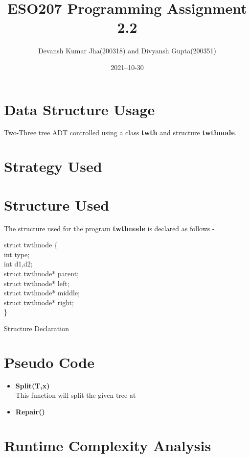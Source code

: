 \documentclass[20pt]{article}
\title{ESO207 Programming Assignment 2.2}
\author{Devansh Kumar Jha(200318) and Divyansh Gupta(200351)}
\date{2021–10-30}
\begin{document}
\maketitle


\section{Data Structure Usage}
Two-Three tree ADT controlled using a class \textbf{twth} and structure \textbf{twthnode}.

\section{Strategy Used}


\newcommand\mycommfont[1]{\small\ttfamily\textcolor{blue}{#1}}

\section{Structure Used}
The structure used for the program \textbf{twthnode} is declared as follows -

\begin{algorithm}

	struct twthnode \{ \\
		\hspace{1cm} int type; \\
		\hspace{1cm} 
		\hspace{1cm} int d1,d2; \\
		\hspace{1cm} 
		\hspace{1cm} struct twthnode* parent; \\
		\hspace{1cm} struct twthnode* left; \\
		\hspace{1cm} struct twthnode* middle; \\
		\hspace{1cm} struct twthnode* right; \\
	\}

	\caption{Structure Declaration}

\end{algorithm}

\section{Pseudo Code}

\begin{itemize}
\item \textbf{Split(T,x)} \\
This function will split the given tree at
\item \textbf{Repair()} \\
\end{itemize}

\section{Runtime Complexity Analysis}
\end{document}
